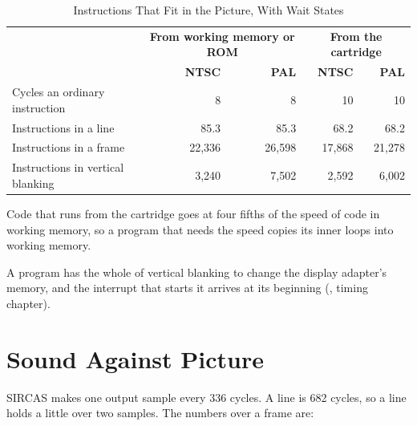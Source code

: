 \begin{table}[H]
	\centering
	\begin{tabular}{lrrrr}
		\toprule
		                                  & \multicolumn{2}{c}{\textbf{From working memory or ROM}} & \multicolumn{2}{c}{\textbf{From the cartridge}}                                \\
		                                  & \textbf{NTSC}                                           & \textbf{PAL}                                    & \textbf{NTSC} & \textbf{PAL} \\
		\midrule
		Cycles an ordinary instruction    & 8                                                       & 8                                               & 10            & 10           \\
		Instructions in a line            & 85.3                                                    & 85.3                                            & 68.2          & 68.2         \\
		Instructions in a frame           & 22,336                                                  & 26,598                                          & 17,868        & 21,278       \\
		Instructions in vertical blanking & 3,240                                                   & 7,502                                           & 2,592         & 6,002        \\
		\bottomrule
	\end{tabular}
	\caption{Instructions That Fit in the Picture, With Wait States}
	\label{tab:cpu-budget-waits}
\end{table}

\noindent Code that runs from the cartridge goes at four fifths of the speed of code in working memory, so a program that needs the
speed copies its inner loops into working memory.

\noindent A program has the whole of vertical blanking to change the display adapter's memory, and the interrupt that
starts it arrives at its beginning (\videomanual{}, timing chapter).

\section{Sound Against Picture}
\label{sec:sound-picture}

SIRCAS makes one output sample every 336 cycles. A line is 682 cycles, so a line holds a little over two samples. The
numbers over a frame are:

